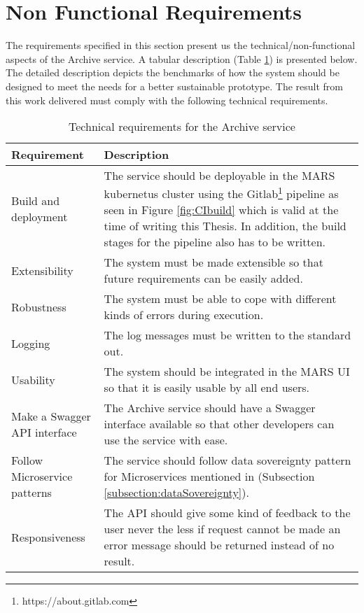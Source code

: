 \section{Non Functional Requirements}
\label{section:technicalReq}
The requirements specified in this section present us the technical/non-functional aspects of the Archive service. A tabular description 
(Table \ref{table: Technical Requirements}) is presented below.
The detailed description depicts the benchmarks of how the system should be designed to meet the needs for a better sustainable prototype.
The result from this work delivered must comply with the following technical requirements.
\begin{table}[h!]
    \centering
    \begin{tabular}{|p{3cm}|p{12cm}|}
            \hline
                \textbf{Requirement}  & \textbf{Description}\\
            \hline
                 Build and deployment & 
                 The service should be deployable in the MARS kubernetus \cite{kubernetes} cluster using the Gitlab\footnote{https://about.gitlab.com} pipeline as seen in Figure \ref{fig:CIbuild}
                 which is valid at the time of writing this Thesis. In addition,
                 the build stages for the pipeline also has to be written. \\
            \hline
                 Extensibility & The system must be made extensible so that future requirements can be easily added.\\
            \hline
                 Robustness & The system must be able to cope with different kinds of errors during execution.\\    
            \hline
                 Logging &  The log messages must be written to the standard out.\\    
            \hline
                 Usability & The system should be integrated in the MARS UI so that it is easily usable by all end users.\\     
            \hline
                 Make a Swagger API interface & The Archive service should have a Swagger \cite{swagger} interface available so that other 
                 developers can use the service with ease.\\         
            \hline
                Follow Microservice patterns & The service should follow data sovereignty pattern for Microservices mentioned in 
                (Subsection \ref{subsection:dataSovereignty}).\\ 
            \hline
                Responsiveness & The API should give some kind of feedback to the user never the less if request cannot be made an 
                error message should be returned instead of no result.\\      
            \hline
           
    \end{tabular} 
    \caption{Technical requirements for the Archive service}
    \label{table: Technical Requirements}  
    \end{table} 
  
    